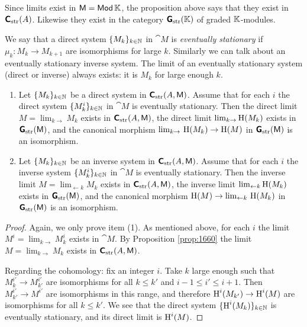 Since limits exist in $\operatorname{\mathsf{M}} = \operatorname{\mathsf{Mod}} \mathbb{K}$, the proposition above says 
that they exist in $\operatorname{\boldsymbol{\mathsf{C}}}_{\mathrm{str}}(A)$. Likewise they exist in the 
category $\boldsymbol{\mathsf{G}}_{\mathrm{str}}(\mathbb{K})$ of graded $\mathbb{K}$-modules.

We say that a direct system $\{ M_k \}_{k \in \mathbb{N}}$ in $\cat{M}$ is {\em 
eventually stationary} if $\mu_k : M_k \to M_{k + 1}$ are isomorphisms for 
large $k$. Similarly we can talk about an eventually stationary inverse system. 
The limit of an eventually stationary system (direct or inverse) always exists: 
it is $M_k$ for large enough $k$. 

\begin{prop} \label{prop:1575} \mbox{}
\begin{enumerate}
\item Let $\{ M_k \}_{k \in \mathbb{N}}$ be a direct system in 
$\operatorname{\boldsymbol{\mathsf{C}}}_{\mathrm{str}}(A, \operatorname{\mathsf{M}})$.  
Assume that for each $i$ the direct system $\{ M^i_k \}_{k \in \mathbb{N}}$ in 
$\cat{M}$ is eventually stationary. Then the direct limit 
$M = \lim_{k \to} M_k$ exists in $\boldsymbol{\mathsf{C}}_{\mathrm{str}}(A, \operatorname{\mathsf{M}})$, 
the  direct limit 
$\lim_{k \to} \operatorname{H}(M_k)$ exists in $\boldsymbol{\mathsf{G}}_{\mathrm{str}}(\operatorname{\mathsf{M}})$, 
and the canonical morphism 
$\lim_{k \to} \, \operatorname{H}(M_k) \to \operatorname{H}(M)$ 
in $\boldsymbol{\mathsf{G}}_{\mathrm{str}}(\operatorname{\mathsf{M}})$ is an isomorphism. 

\item Let $\{ M_k \}_{k \in \mathbb{N}}$ be an inverse system in 
$\operatorname{\boldsymbol{\mathsf{C}}}_{\mathrm{str}}(A, \operatorname{\mathsf{M}})$. Assume that for each $i$ the inverse system 
$\{ M^i_k \}_{k \in \mathbb{N}}$ in $\cat{M}$ is eventually stationary. Then the 
inverse limit $M = \lim_{\leftarrow k} M_k$ exists in 
$\boldsymbol{\mathsf{C}}_{\mathrm{str}}(A, \operatorname{\mathsf{M}})$, the  inverse limit 
$\lim_{\leftarrow k} \operatorname{H}(M_k)$ exists in $\boldsymbol{\mathsf{G}}_{\mathrm{str}}(\operatorname{\mathsf{M}})$, 
and the canonical morphism 
$\operatorname{H}(M) \to \lim_{\leftarrow k} \, \operatorname{H}(M_k)$
in $\boldsymbol{\mathsf{G}}_{\mathrm{str}}(\operatorname{\mathsf{M}})$ is an isomorphism. 
\end{enumerate}
\end{prop}

\begin{proof}
Again, we only prove item (1). 
As mentioned above, for each $i$ the limit
$M^i = \lim_{k \to} M^i_k$ exists in $\cat{M}$.
By Proposition \ref{prop:1660} the limit 
$M = \lim_{k \to} M_k$ exists in $\boldsymbol{\mathsf{C}}_{\mathrm{str}}(A, \operatorname{\mathsf{M}})$.

Regarding the cohomology: fix an integer $i$. 
Take $k$ large enough such that 
$M^{i'}_k \to M^{i'}_{k'}$ are isomorphisms for all $k \leq k'$ and 
$i - 1 \leq  i' \leq i + 1$. Then 
$M^{i'}_{k'} \to M^{i'}$ 
are isomorphisms in this range, and therefore 
$\operatorname{H}^i(M_{k'}) \to \operatorname{H}^i(M)$ are isomorphisms for all $k \leq k'$. 
We see that the direct system 
$\{ \operatorname{H}^i(M_k) \}_{k \in \mathbb{N}}$
is eventually stationary, and its direct limit is 
$\operatorname{H}^i(M)$.
\end{proof}

